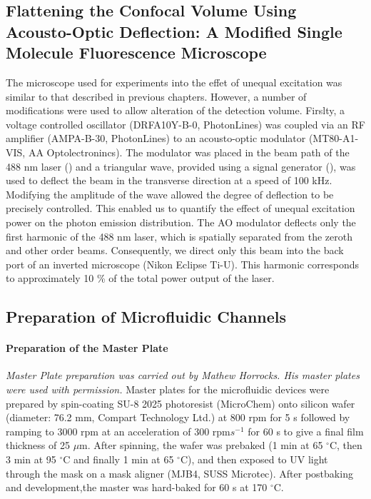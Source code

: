 \subsection{Flattening the Confocal Volume Using Acousto-Optic Deflection: A Modified Single Molecule Fluorescence Microscope}
The microscope used for experiments into the effet of unequal excitation was similar to that described in previous chapters. However, a number of modifications were used to allow alteration of the detection volume. Firslty, a voltage controlled oscillator (DRFA10Y-B-0, PhotonLines) was coupled via an RF amplifier (AMPA-B-30, PhotonLines) to an acousto-optic modulator (MT80-A1-VIS, AA Optolectronincs). The modulator was placed in the beam path of the 488 nm laser () and a triangular wave, provided using a signal generator (), was used to deflect the beam in the transverse direction at a speed of 100 kHz. Modifying the amplitude of the wave allowed the degree of deflection to be precisely controlled. This enabled us to quantify the effect of unequal excitation power on the photon emission distribution. The AO modulator deflects only the first harmonic of the 488 nm laser, which is spatially separated from the zeroth and other order beams. Consequently, we direct only this beam into the back port of an inverted microscope (Nikon Eclipse Ti-U). This harmonic corresponds to approximately 10 \% of the total power output of the laser.

\subsection{Preparation of Microfluidic Channels}
\paragraph{Preparation of the Master Plate}
\emph{Master Plate preparation was carried out by Mathew Horrocks. His master plates were used with permission.}
Master plates for the microfluidic devices were prepared by spin-coating SU-8 2025 photoresist (MicroChem) onto silicon wafer (diameter: 76.2 mm, Compart Technology Ltd.) at 800 rpm for 5 s followed by ramping to 3000 rpm at an acceleration of 300 rpm$s^{-1}$ for 60 s to give a final film thickness of 25 $\mu$m. After spinning, the wafer was prebaked (1 min at 65 $^{\circ}$C, then 3 min at 95 $^{\circ}$C and finally 1 min at 65 $^{\circ}$C), and then exposed to UV light through the mask on a mask aligner (MJB4, SUSS Microtec). After postbaking and development,the master was hard-baked for 60 s at 170 $^{\circ}$C.

